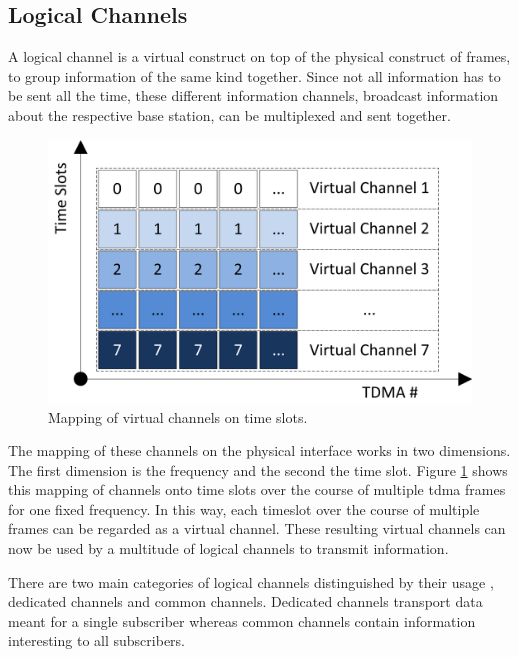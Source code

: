 \subsection{Logical Channels}
\label{sec:channels}
A logical channel is a virtual construct on top of the physical construct of frames, to group information of the same kind together.
Since not all information has to be sent all the time, these different information channels, \eg broadcast information about the respective base station, can be multiplexed and sent together.
\begin{figure}
	\centering
	\includegraphics{../Images/Channels}
	\caption{Mapping of virtual channels on time slots.}
	\label{fig:channels}
\end{figure}
The mapping of these channels on the physical interface works in two dimensions.
The first dimension is the frequency and the second the time slot.
Figure \ref{fig:channels} shows this mapping of channels onto time slots over the course of multiple \gls{tdma} frames for one fixed frequency.
In this way, each timeslot over the course of multiple frames can be regarded as a virtual channel.
These resulting virtual channels can now be used by a multitude of logical channels to transmit information.

There are two main categories of logical channels distinguished by their usage \cite{kommsys2006}, dedicated channels and common channels.
Dedicated channels transport data meant for a single subscriber whereas common channels contain information interesting to all subscribers.

